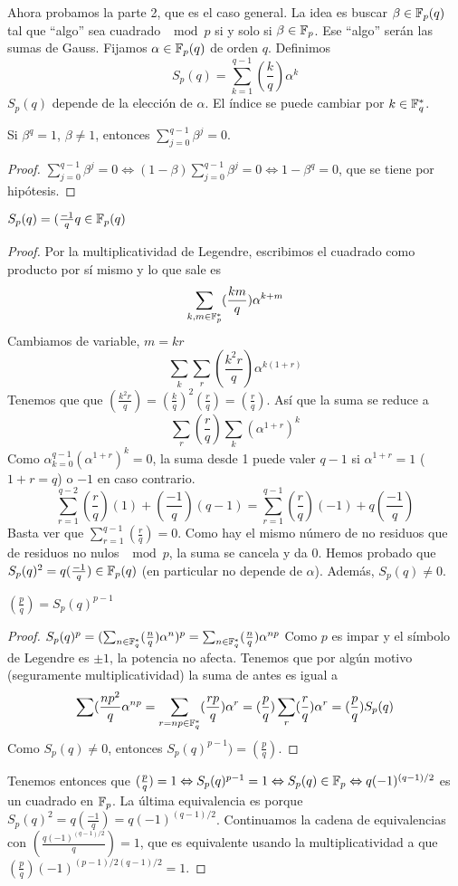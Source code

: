 \documentclass[CR.tex]{subfiles}
\begin{document}
\begin{dem}
Ahora probamos la parte 2, que es el caso general. La idea es buscar $\beta\in\mathbb{F}_p(q)$ tal que ``algo'' sea cuadrado $\mod p$ si y solo si $\beta\in\mathbb{F}_p$. Ese ``algo'' serán las sumas de Gauss. Fijamos $\alpha\in\mathbb{F}_p(q)$ de orden $q$. Definimos
\[
S_p(q)=\sum_{k=1}^{q-1}\left(\frac{k}{q}\right)\alpha^k
\]
$S_p(q)$ depende de la elección de $\alpha$. El índice se puede cambiar por $k\in\mathbb{F}_q^*$.
\begin{lemma}
Si $\beta^q=1$, $\beta\neq 1$, entonces $\sum_{j=0}^{q-1}\beta^j=0$. 
\end{lemma} 
\begin{proof}
$\sum_{j=0}^{q-1}\beta^j=0\Leftrightarrow (1-\beta)\sum_{j=0}^{q-1}\beta^j=0\Leftrightarrow 1-\beta^q=0$, que se tiene por hipótesis. 
\end{proof}

\begin{lemma}
$S_p(q)=(\frac{-1}{q}q\in\mathbb{F}_p(q)$
\end{lemma}
\begin{proof}
Por la multiplicatividad de Legendre, escribimos el cuadrado como producto por sí mismo y lo que sale es
\[
\sum_{k,m\in\mathbb{F}_p^*}(\frac{km}{q})\alpha^{k+m}
\]
Cambiamos de variable, $m=kr$
\[
\sum_{k}\sum_r(\frac{k^2r}{q})\alpha^{k(1+r)}
\]
Tenemos que que $(\frac{k^2r}{q})=(\frac{k}{q})^2(\frac{r}{q})=(\frac{r}{q})$. Así que la suma se reduce a
\[
\sum_r(\frac{r}{q})\sum_k(\alpha^{1+r})^k
\]
Como $\alpha_{k=0}^{q-1}(\alpha^{1+r})^k=0$, la suma desde 1 puede valer $q-1$ si $\alpha^{1+r}=1$ ($1+r=q$) o $-1$ en caso contrario. 
\[
\sum_{r=1}^{q-2}(\frac{r}{q})(1)+(\frac{-1}{q})(q-1)=\sum_{r=1}^{q-1}(\frac{r}{q})(-1)+q(\frac{-1}{q})
\]
Basta ver que $\sum_{r=1}^{q-1}(\frac{r}{q})=0$. Como hay el mismo número de no residuos que de residuos no nulos $\mod  p$, la suma se cancela y da 0. Hemos probado que $S_p(q)^2=q(\frac{-1}{q})\in\mathbb{F}_p(q)$ (en particular no depende de $\alpha$). Además, $S_p(q)\neq 0$. 

\begin{lemma}
$\left(\frac{p}{q}\right)=S_p(q)^{p-1}$
\end{lemma}
\begin{proof}
$S_p(q)^p=(\sum_{n\in\mathbb{F}_q^*}(\frac{n}{q})\alpha^n)^p=\sum_{n\in\mathbb{F}^*_q}(\frac{n}{q})\alpha^{np}$
Como $p$ es impar y el símbolo de Legendre es $\pm 1$, la potencia no afecta. 
Tenemos que por algún motivo (seguramente multiplicatividad) la suma de antes es igual a 
\[
\sum(\frac{np^2}{q}\alpha^{np}=\sum_{r=np\in \mathbb{F}_q^*}(\frac{rp}{q})\alpha^r=(\frac{p}{q})\sum_r(\frac{r}{q})\alpha^r=(\frac{p}{q})S_p(q)
\]
Como $S_p(q)\neq 0$, entonces $S_p(q)^{p-1})=(\frac{p}{q})$.
\end{proof}
Tenemos entonces que $(\frac{p}{q})=1\Leftrightarrow S_p(q)^{p-1}=1\Leftrightarrow S_p(q)\in\mathbb{F}_p\Leftrightarrow q(-1)^{(q-1)/2}$ es un cuadrado en $\mathbb{F}_p$. La última equivalencia es porque $S_p(q)^2=q(\frac{-1}{q})=q(-1)^{(q-1)/2}$. Continuamos la cadena de equivalencias con $(\frac{q(-1)^{(q-1)/2}}{q})=1$, que es equivalente usando la multiplicatividad a que $(\frac{p}{q})(-1)^{(p-1)/2 (q-1)/2}=1$. 

\end{proof}
\end{dem}
\end{document}
